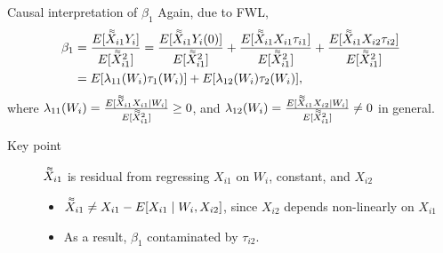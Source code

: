 \documentclass[notes,11pt, aspectratio=169]{beamer}
\newcommand\1{\operatorname{\mathbbm{1}}\indicatorfence}
\newcommand{\dbtilde}[1]{\accentset{\approx}{#1}}
\begin{document}
\begin{frame}{Causal interpretation of $\beta_{1}$}\label{slide:fwl_derivation}
  Again, due to FWL,
    \begin{equation*}
      \begin{split}
        \beta_{1}&=\frac{E[\dbtilde{X}_{i1}Y_i]}{E[\dbtilde{X}_{i1}^2]} =
        {\frac{E[\dbtilde{X}_{i1}Y_{i}(0)]}{E[\dbtilde{X}_{i1}^2]}}+
        \frac{E[\dbtilde{X}_{i1}X_{i1}\tau_{i1}]}{E[\dbtilde{X}_{i1}^2]}
        +\frac{E[\dbtilde{X}_{i1}X_{i2}\tau_{i2}]}{E[\dbtilde{X}_{i1}^2]}\\
        &= E[\lambda_{11}(W_{i})\tau_{1}(W_{i})]
        +E[\lambda_{12}(W_{i})\tau_{2}(W_{i})],
      \end{split}
     \end{equation*}
     where
     $ \lambda_{11}(W_{i})= \frac{E[\dbtilde{X}_{i1}X_{i1}\mid
       W_{i}]}{E[\dbtilde{X}_{i1}^2]} \geq 0$, and
     $\lambda_{12}(W_i) =\frac{E[\dbtilde{X}_{i1}X_{i2}\mid
       W_{i}]}{E[\dbtilde{X}_{i1}^2]} \neq 0$ in general.
  \begin{description}
  \item[Key point] $\dbtilde{X}_{i1}$ is residual from regressing $X_{i1}$ on
    $W_{i}$, constant, \alert{and} $X_{i2}$
    \begin{itemize}
    \item $\dbtilde{X}_{i1} \not= X_{i1} - E[X_{i1} \mid W_{i}, X_{i2}]$, since
      $X_{i2}$ \alert{depends non-linearly} on $X_{i1}$
    \item As a result, $\beta_{1}$ \alert{contaminated} by $\tau_{i2}$.
    \end{itemize}
  \end{description}
\end{frame}
\end{document}
